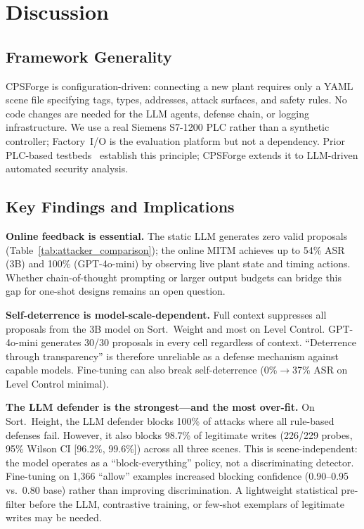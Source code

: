 \section{Discussion}
\label{sec:discussion}

\subsection{Framework Generality}

CPSForge is configuration-driven: connecting a new plant requires only a YAML scene file specifying tags, types, addresses, attack surfaces, and safety rules. No code changes are needed for the LLM agents, defense chain, or logging infrastructure. We use a real Siemens S7-1200 PLC rather than a synthetic controller; Factory~I/O is the evaluation platform but not a dependency. Prior PLC-based testbeds~\cite{dehlaghi2023icssim, garcia2025sphere, pramadi2026simpleics} establish this principle; CPSForge extends it to LLM-driven automated security analysis.

\subsection{Key Findings and Implications}

\textbf{Online feedback is essential.} The static LLM generates zero valid proposals (Table~\ref{tab:attacker_comparison}); the online MITM achieves up to 54\% ASR (3B) and 100\% (GPT-4o-mini) by observing live plant state and timing actions. Whether chain-of-thought prompting or larger output budgets can bridge this gap for one-shot designs remains an open question.

\textbf{Self-deterrence is model-scale-dependent.} Full context suppresses all proposals from the 3B model on Sort.~Weight and most on Level Control. GPT-4o-mini generates 30/30 proposals in every cell regardless of context. ``Deterrence through transparency'' is therefore unreliable as a defense mechanism against capable models. Fine-tuning can also break self-deterrence (0\%$\to$37\% ASR on Level Control minimal).

\textbf{The LLM defender is the strongest---and the most over-fit.} On Sort.~Height, the LLM defender blocks 100\% of attacks where all rule-based defenses fail. However, it also blocks 98.7\% of legitimate writes (226/229 probes, 95\% Wilson CI [96.2\%, 99.6\%]) across all three scenes. This is scene-independent: the model operates as a ``block-everything'' policy, not a discriminating detector. Fine-tuning on 1,366 ``allow'' examples increased blocking confidence (0.90--0.95 vs.\ 0.80 base) rather than improving discrimination. A lightweight statistical pre-filter before the LLM, contrastive training, or few-shot exemplars of legitimate writes may be needed.

